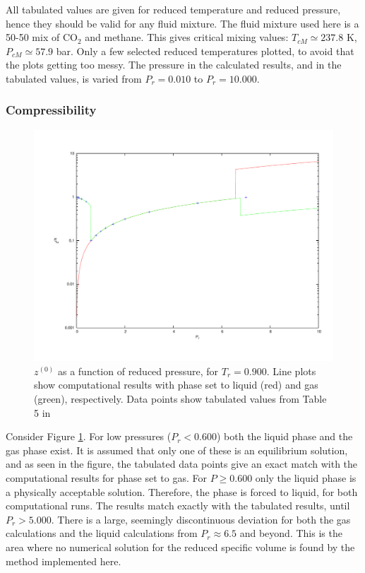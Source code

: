 \documentclass[internal,english]{sintefmemo2012}
\numberwithin{equation}{section}
\begin{document}
All tabulated values are given for reduced temperature and reduced pressure, hence they should be valid for any fluid mixture. The fluid mixture used here is a 50-50 mix of CO$_2$ and methane. This gives critical mixing values: $T_{cM} \simeq 237.8$ K, $P_{cM} \simeq 57.9$ bar. Only a few selected reduced temperatures plotted, to avoid that the plots getting too messy. The pressure in the calculated results, and in the tabulated values, is varied from $P_r = 0.010$ to $P_r = 10.000$.

\subsubsection*{Compressibility}
\begin{figure}
	\centering
	\includegraphics[trim = 1.5cm 2cm 0 1cm, clip = true, width=14cm]{z0Tc090}
	\caption{$z^{(0)}$ as a function of reduced pressure, for $T_r = 0.900$. Line plots show computational results with phase set to liquid (red) and gas (green), respectively. Data points show tabulated values from Table 5 in \cite{LK}}
	\label{fig:z0Tc090}
\end{figure}

Consider Figure \ref{fig:z0Tc090}. For low pressures ($P_r < 0.600$) both the liquid phase and the gas phase exist. It is assumed that only one of these is an equilibrium solution, and as seen in the figure, the tabulated data points give an exact match with the computational results for phase set to gas. For $P \geq 0.600$ only the liquid phase is a physically acceptable solution. Therefore, the phase is forced to liquid, for both computational runs. The results match exactly with the tabulated results, until $P_r > 5.000$. There is a large, seemingly discontinuous deviation for both the gas calculations and the liquid calculations from $P_r \approx 6.5$ and beyond. This is the area where no numerical solution for the reduced specific volume is found by the method implemented here.
\end{document}
